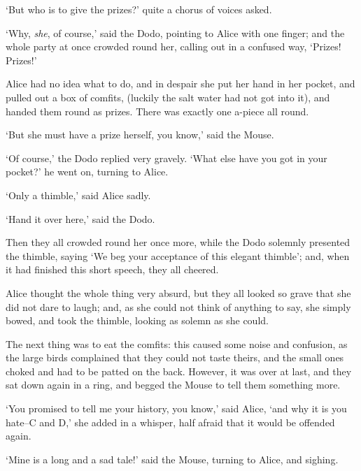   `But who is to give the prizes?' quite a chorus of voices
asked.

  `Why, {\it she}, of course,' said the Dodo, pointing to Alice with
one finger; and the whole party at once crowded round her,
calling out in a confused way, `Prizes! Prizes!'

  Alice had no idea what to do, and in despair she put her hand
in her pocket, and pulled out a box of comfits, (luckily the salt
water had not got into it), and handed them round as prizes.
There was exactly one a-piece all round.

  `But she must have a prize herself, you know,' said the Mouse.

  `Of course,' the Dodo replied very gravely.  `What else have
you got in your pocket?' he went on, turning to Alice.

  `Only a thimble,' said Alice sadly.

  `Hand it over here,' said the Dodo.

  Then they all crowded round her once more, while the Dodo
solemnly presented the thimble, saying `We beg your acceptance of
this elegant thimble'; and, when it had finished this short
speech, they all cheered.

  Alice thought the whole thing very absurd, but they all looked
so grave that she did not dare to laugh; and, as she could not
think of anything to say, she simply bowed, and took the thimble,
looking as solemn as she could.

  The next thing was to eat the comfits:  this caused some noise
and confusion, as the large birds complained that they could not
taste theirs, and the small ones choked and had to be patted on
the back.  However, it was over at last, and they sat down again
in a ring, and begged the Mouse to tell them something more.

  `You promised to tell me your history, you know,' said Alice,
`and why it is you hate--C and D,' she added in a whisper, half
afraid that it would be offended again.

  `Mine is a long and a sad tale!' said the Mouse, turning to
Alice, and sighing.

